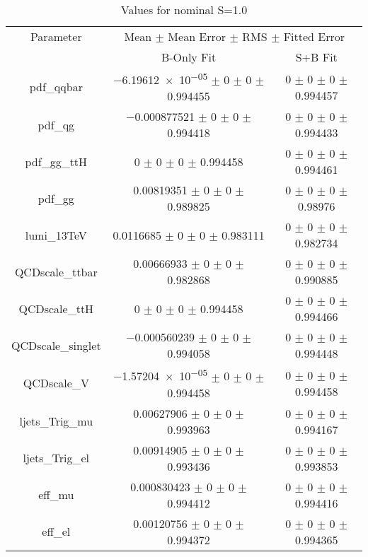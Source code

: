 \begin{table}
\centering
\caption{Values for nominal S=1.0}
\begin{tabular}{ccc}
\toprule
Parameter & \multicolumn{2}{c}{Mean $\pm$ Mean Error $\pm$ RMS $\pm$ Fitted Error}\\
 & B-Only Fit & S+B Fit\\
\midrule
pdf\_qqbar & \num{-6.19612e-05} $\pm$ \num{0} $\pm$ \num{0} $\pm$ \num{0.994455} & \num{0} $\pm$ \num{0} $\pm$ \num{0} $\pm$ \num{0.994457}\\
pdf\_qg & \num{-0.000877521} $\pm$ \num{0} $\pm$ \num{0} $\pm$ \num{0.994418} & \num{0} $\pm$ \num{0} $\pm$ \num{0} $\pm$ \num{0.994433}\\
pdf\_gg\_ttH & \num{0} $\pm$ \num{0} $\pm$ \num{0} $\pm$ \num{0.994458} & \num{0} $\pm$ \num{0} $\pm$ \num{0} $\pm$ \num{0.994461}\\
pdf\_gg & \num{0.00819351} $\pm$ \num{0} $\pm$ \num{0} $\pm$ \num{0.989825} & \num{0} $\pm$ \num{0} $\pm$ \num{0} $\pm$ \num{0.98976}\\
lumi\_13TeV & \num{0.0116685} $\pm$ \num{0} $\pm$ \num{0} $\pm$ \num{0.983111} & \num{0} $\pm$ \num{0} $\pm$ \num{0} $\pm$ \num{0.982734}\\
QCDscale\_ttbar & \num{0.00666933} $\pm$ \num{0} $\pm$ \num{0} $\pm$ \num{0.982868} & \num{0} $\pm$ \num{0} $\pm$ \num{0} $\pm$ \num{0.990885}\\
QCDscale\_ttH & \num{0} $\pm$ \num{0} $\pm$ \num{0} $\pm$ \num{0.994458} & \num{0} $\pm$ \num{0} $\pm$ \num{0} $\pm$ \num{0.994466}\\
QCDscale\_singlet & \num{-0.000560239} $\pm$ \num{0} $\pm$ \num{0} $\pm$ \num{0.994058} & \num{0} $\pm$ \num{0} $\pm$ \num{0} $\pm$ \num{0.994448}\\
QCDscale\_V & \num{-1.57204e-05} $\pm$ \num{0} $\pm$ \num{0} $\pm$ \num{0.994458} & \num{0} $\pm$ \num{0} $\pm$ \num{0} $\pm$ \num{0.994458}\\
ljets\_Trig\_mu & \num{0.00627906} $\pm$ \num{0} $\pm$ \num{0} $\pm$ \num{0.993963} & \num{0} $\pm$ \num{0} $\pm$ \num{0} $\pm$ \num{0.994167}\\
ljets\_Trig\_el & \num{0.00914905} $\pm$ \num{0} $\pm$ \num{0} $\pm$ \num{0.993436} & \num{0} $\pm$ \num{0} $\pm$ \num{0} $\pm$ \num{0.993853}\\
eff\_mu & \num{0.000830423} $\pm$ \num{0} $\pm$ \num{0} $\pm$ \num{0.994412} & \num{0} $\pm$ \num{0} $\pm$ \num{0} $\pm$ \num{0.994416}\\
eff\_el & \num{0.00120756} $\pm$ \num{0} $\pm$ \num{0} $\pm$ \num{0.994372} & \num{0} $\pm$ \num{0} $\pm$ \num{0} $\pm$ \num{0.994365}\\

\end{tabular}
\end{table}
